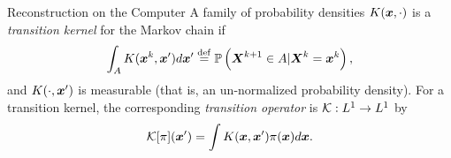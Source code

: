 \begin{chapter}{Reconstruction on the Computer}
%
A family of probability densities $K(\mbox{\boldmath$x$},\cdot)$ is a \emph{transition kernel} for the Markov chain if
\begin{equation}
  \int_A K(\mbox{\boldmath$x$}^k,\mbox{\boldmath$x$}') d\mbox{\boldmath$x$}'
    \stackrel{\rm def}{=} \mathbb P\left( \mbox{\boldmath$X$}^{k+1} \in A | \mbox{\boldmath$X$}^k= \mbox{\boldmath$x$}^k\right),
\end{equation}
and $K(\cdot , \mbox{\boldmath$x$}')$ is measurable (that is, an un-normalized probability density).
For a transition kernel, the corresponding \emph{transition operator} is $\mathcal K:L^1\to L^1$ by
\begin{equation}
  \mathcal K [\pi](\mbox{\boldmath$x$}') = \int K(\mbox{\boldmath$x$},\mbox{\boldmath$x$}') \pi(\mbox{\boldmath$x$})d\mbox{\boldmath$x$}.
\end{equation}


\end{chapter}
